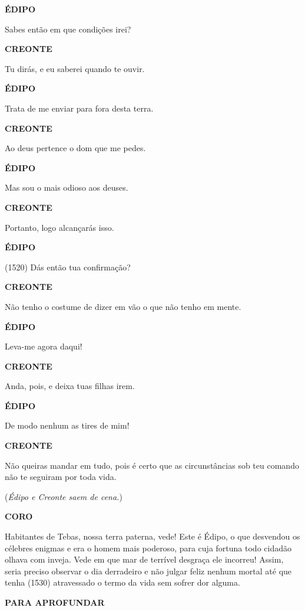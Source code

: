 \textbf{ÉDIPO}

Sabes então em que condições irei?

\textbf{CREONTE }

Tu dirás, e eu saberei quando te ouvir.

\textbf{ÉDIPO}

Trata de me enviar para fora desta terra.

\textbf{CREONTE }

Ao deus pertence o dom que me pedes.

\textbf{ÉDIPO}

Mas sou o mais odioso aos deuses.

\textbf{CREONTE }

Portanto, logo alcançarás isso.

\textbf{ÉDIPO}

(1520) Dás então tua confirmação?

\textbf{CREONTE }

Não tenho o costume de dizer em vão o que não tenho em mente.

\textbf{ÉDIPO}

Leva-me agora daqui!

\textbf{CREONTE }

Anda, pois, e deixa tuas filhas irem.

\textbf{ÉDIPO}

De modo nenhum as tires de mim!

\textbf{CREONTE}

Não queiras mandar em tudo, pois é certo que as circunstâncias sob teu
comando não te seguiram por toda vida.

(\emph{Édipo e Creonte saem de cena.})

\textbf{CORO}

Habitantes de Tebas, nossa terra paterna, vede! Este é Édipo, o que
desvendou os célebres enigmas e era o homem mais poderoso, para cuja
fortuna todo cidadão olhava com inveja. Vede em que mar de terrível
desgraça ele incorreu! Assim, seria preciso observar o dia derradeiro e
não julgar feliz nenhum mortal até que tenha (1530) atravessado o termo
da vida sem sofrer dor alguma.

\textbf{PARA APROFUNDAR}

